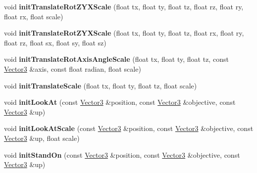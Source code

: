 \begin{DoxyCompactItemize}
\item 
void {\bfseries init\+Translate\+Rot\+Z\+Y\+X\+Scale} (float tx, float ty, float tz, float rz, float ry, float rx, float scale)\hypertarget{class_magnum_1_1_matrix4_aec4cbc0ec773a4ec9da6480dc988b676}{}\label{class_magnum_1_1_matrix4_aec4cbc0ec773a4ec9da6480dc988b676}

\item 
void {\bfseries init\+Translate\+Rot\+Z\+Y\+X\+Scale} (float tx, float ty, float tz, float rx, float ry, float rz, float sx, float sy, float sz)\hypertarget{class_magnum_1_1_matrix4_a14d34a2948b84214a91064ba24f0a3e2}{}\label{class_magnum_1_1_matrix4_a14d34a2948b84214a91064ba24f0a3e2}

\item 
void {\bfseries init\+Translate\+Rot\+Axis\+Angle\+Scale} (float tx, float ty, float tz, const \hyperlink{class_magnum_1_1_vector3}{Vector3} \&axis, const float radian, float scale)\hypertarget{class_magnum_1_1_matrix4_a3491767885ba86e1b520210d5f232dff}{}\label{class_magnum_1_1_matrix4_a3491767885ba86e1b520210d5f232dff}

\item 
void {\bfseries init\+Translate\+Scale} (float tx, float ty, float tz, float scale)\hypertarget{class_magnum_1_1_matrix4_ac1ef352277828ef1bc8ad04b6632a1f0}{}\label{class_magnum_1_1_matrix4_ac1ef352277828ef1bc8ad04b6632a1f0}

\item 
void {\bfseries init\+Look\+At} (const \hyperlink{class_magnum_1_1_vector3}{Vector3} \&position, const \hyperlink{class_magnum_1_1_vector3}{Vector3} \&objective, const \hyperlink{class_magnum_1_1_vector3}{Vector3} \&up)\hypertarget{class_magnum_1_1_matrix4_ac4acd38c64bb1cdfc15c20ade6a5cf44}{}\label{class_magnum_1_1_matrix4_ac4acd38c64bb1cdfc15c20ade6a5cf44}

\item 
void {\bfseries init\+Look\+At\+Scale} (const \hyperlink{class_magnum_1_1_vector3}{Vector3} \&position, const \hyperlink{class_magnum_1_1_vector3}{Vector3} \&objective, const \hyperlink{class_magnum_1_1_vector3}{Vector3} \&up, float scale)\hypertarget{class_magnum_1_1_matrix4_abbea4957a07629a5d75fa29f0cc4210a}{}\label{class_magnum_1_1_matrix4_abbea4957a07629a5d75fa29f0cc4210a}

\item 
void {\bfseries init\+Stand\+On} (const \hyperlink{class_magnum_1_1_vector3}{Vector3} \&position, const \hyperlink{class_magnum_1_1_vector3}{Vector3} \&objective, const \hyperlink{class_magnum_1_1_vector3}{Vector3} \&up)\hypertarget{class_magnum_1_1_matrix4_ac9483e5bc7832192d38516bc71f1cb3f}{}\label{class_magnum_1_1_matrix4_ac9483e5bc7832192d38516bc71f1cb3f}


\end{DoxyCompactItemize}
